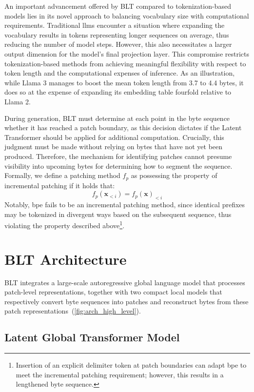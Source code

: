 An important advancement offered by {\textsc BLT} compared to tokenization-based models lies in its novel approach to balancing vocabulary size with computational requirements. Traditional llms encounter a situation where expanding the vocabulary results in tokens representing longer sequences on average, thus reducing the number of model steps. However, this also necessitates a larger output dimension for the model’s final projection layer. This compromise restricts tokenization-based methods from achieving meaningful flexibility with respect to token length and the computational expenses of inference. As an illustration, while Llama 3 manages to boost the mean token length from 3.7 to 4.4 bytes, it does so at the expense of expanding its embedding table fourfold relative to Llama 2.

During generation, {\textsc BLT} must determine at each point in the byte sequence whether it has reached a patch boundary, as this decision dictates if the Latent Transformer should be applied for additional computation. Crucially, this judgment must be made without relying on bytes that have not yet been produced. Therefore, the mechanism for identifying patches cannot presume visibility into upcoming bytes for determining how to segment the sequence. Formally, we define a patching method $f_p$ as possessing the property of incremental patching if it holds that:
$$f_p(\pmb{x}_{<i}) = f_p(\pmb{x})_{<i}$$
Notably, bpe fails to be an incremental patching method, since identical prefixes may be tokenized in divergent ways based on the subsequent sequence, thus violating the property described above\footnote{Insertion of an explicit delimiter token at patch boundaries can adapt bpe to meet the incremental patching requirement; however, this results in a lengthened byte sequence.}.

\section{{\textsc BLT} Architecture}
\label{section:architecture}
{\textsc BLT} integrates a large-scale autoregressive global language model that processes patch-level representations, together with two compact local models that respectively convert byte sequences into patches and reconstruct bytes from these patch representations~(\autoref{fig:arch_high_level}).

\subsection{Latent Global Transformer Model}

